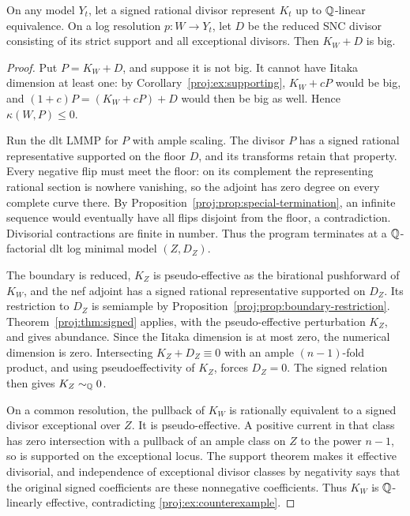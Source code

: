 \begin{proposition}\label{proj:prop:signed-alternative}
On any model \(Y_t\), let a signed rational divisor
represent \(K_t\) up to \(\mathbb{Q}\)-linear equivalence. On a
log resolution \(p:W\to Y_t\), let \(D\) be the reduced
SNC divisor consisting of its strict support and all
exceptional divisors. Then \(K_W+D\) is big.
\end{proposition}
\begin{proof}
Put \(P=K_W+D\), and suppose it is not big. It cannot
have Iitaka dimension at least one: by
Corollary~\ref{proj:ex:supporting}, \(K_W+cP\) would be big,
and
\((1+c)P=(K_W+cP)+D\) would then be big as well.
Hence \(\kappa(W,P)\leq0\).

Run the dlt LMMP for \(P\) with ample scaling.
The divisor \(P\) has a signed rational representative
supported on the floor \(D\), and its transforms retain
that property. Every negative flip must meet the floor:
on its complement the representing rational section is
nowhere vanishing, so the adjoint has zero degree on
every complete curve there. By
Proposition~\ref{proj:prop:special-termination}, an infinite
sequence would eventually have all flips disjoint from
the floor, a contradiction. Divisorial contractions
are finite in number. Thus the program terminates at
a \(\mathbb{Q}\)-factorial dlt log minimal model
\((Z,D_Z)\).

The boundary is reduced, \(K_Z\) is pseudo-effective
as the birational pushforward of \(K_W\), and the nef
adjoint has a signed rational representative supported
on \(D_Z\). Its restriction to \(D_Z\) is semiample
by Proposition~\ref{proj:prop:boundary-restriction}.
Theorem~\ref{proj:thm:signed} applies, with the
pseudo-effective perturbation \(K_Z\), and gives
abundance. Since the Iitaka dimension is at most zero,
the numerical dimension is zero. Intersecting
\(K_Z+D_Z\equiv0\) with an ample
\((n-1)\)-fold product, and using pseudoeffectivity of
\(K_Z\), forces \(D_Z=0\). The signed relation then
gives \(K_Z\sim_{\mathbb{Q}}0\).

On a common resolution, the pullback of \(K_W\) is
rationally equivalent to a signed divisor exceptional
over \(Z\). It is pseudo-effective. A positive current
in that class has zero intersection with a pullback
of an ample class on \(Z\) to the power \(n-1\),
so is supported on the exceptional locus. The support
theorem makes it effective divisorial, and independence
of exceptional divisor classes by negativity says that
the original signed coefficients are these nonnegative
coefficients. Thus \(K_W\) is \(\mathbb{Q}\)-linearly effective,
contradicting \eqref{proj:ex:counterexample}.
\end{proof}
